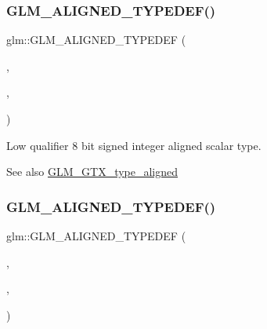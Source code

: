 \subsubsection{\texorpdfstring{G\+L\+M\+\_\+\+A\+L\+I\+G\+N\+E\+D\+\_\+\+T\+Y\+P\+E\+D\+E\+F()}{GLM\_ALIGNED\_TYPEDEF()}\hspace{0.1cm}{\footnotesize\ttfamily [1/209]}}
{\footnotesize\ttfamily glm\+::\+G\+L\+M\+\_\+\+A\+L\+I\+G\+N\+E\+D\+\_\+\+T\+Y\+P\+E\+D\+EF (\begin{DoxyParamCaption}\item[{\hyperlink{group__gtc__type__precision_gaf9e675b6392764242ae87eb179e9d3d6}{lowp\+\_\+int8}}]{,  }\item[{aligned\+\_\+lowp\+\_\+int8}]{,  }\item[{1}]{ }\end{DoxyParamCaption})}

Low qualifier 8 bit signed integer aligned scalar type. \begin{DoxySeeAlso}{See also}
\hyperlink{group__gtx__type__aligned}{G\+L\+M\+\_\+\+G\+T\+X\+\_\+type\+\_\+aligned} 
\end{DoxySeeAlso}
\mbox{\label{group__gtx__type__aligned_ga5bb5dd895ef625c1b113f2cf400186b0}} 
\subsubsection{\texorpdfstring{G\+L\+M\+\_\+\+A\+L\+I\+G\+N\+E\+D\+\_\+\+T\+Y\+P\+E\+D\+E\+F()}{GLM\_ALIGNED\_TYPEDEF()}\hspace{0.1cm}{\footnotesize\ttfamily [2/209]}}
{\footnotesize\ttfamily glm\+::\+G\+L\+M\+\_\+\+A\+L\+I\+G\+N\+E\+D\+\_\+\+T\+Y\+P\+E\+D\+EF (\begin{DoxyParamCaption}\item[{\hyperlink{group__gtc__type__precision_ga71fc0c399fa4780507748b643733f153}{lowp\+\_\+int16}}]{,  }\item[{aligned\+\_\+lowp\+\_\+int16}]{,  }\item[{2}]{ }\end{DoxyParamCaption})}

